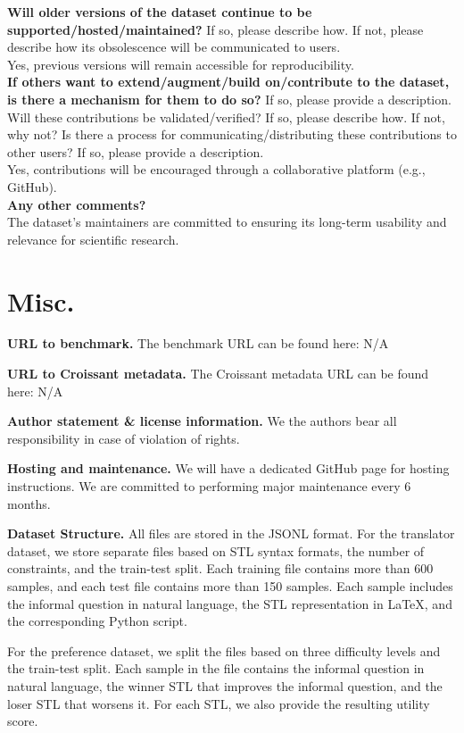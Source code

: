    \textcolor{\sectioncolor}{\textbf{Will older versions of the dataset continue to be
    supported/hosted/maintained?
    }
    If so, please describe how. If not, please describe how its obsolescence
    will be communicated to users.
    } \\
    Yes, previous versions will remain accessible for reproducibility. \\

    \textcolor{\sectioncolor}{\textbf{If others want to extend/augment/build on/contribute to the dataset, is
    there a mechanism for them to do so?
    }
    If so, please provide a description. Will these contributions be
    validated/verified? If so, please describe how. If not, why not? Is there a
    process for communicating/distributing these contributions to other users?
    If so, please provide a description.
    } \\
    Yes, contributions will be encouraged through a collaborative platform (e.g., GitHub).\\

    \textcolor{\sectioncolor}{\textbf{Any other comments?
    }} \\
    The dataset’s maintainers are committed to ensuring its long-term usability and relevance for scientific research.

\vspace{-2ex}
\section{Misc.}
\textbf{URL to benchmark.} The benchmark URL can be found here: 
N/A

\textbf{URL to Croissant metadata.} The Croissant metadata URL can be found here:
N/A


\textbf{Author statement \& license information.} We the authors bear all responsibility in case of violation of rights.

\textbf{Hosting and maintenance.}
We will have a dedicated GitHub page for hosting instructions.
We are committed to performing major maintenance every 6 months.

\textbf{Dataset Structure.}
All files are stored in the JSONL format. For the translator dataset, we store separate files based on STL syntax formats, the number of constraints, and the train-test split. Each training file contains more than 600 samples, and each test file contains more than 150 samples. Each sample includes the informal question in natural language, the STL representation in LaTeX, and the corresponding Python script.

For the preference dataset, we split the files based on three difficulty levels and the train-test split. Each sample in the file contains the informal question in natural language, the winner STL that improves the informal question, and the loser STL that worsens it. For each STL, we also provide the resulting utility score. 
